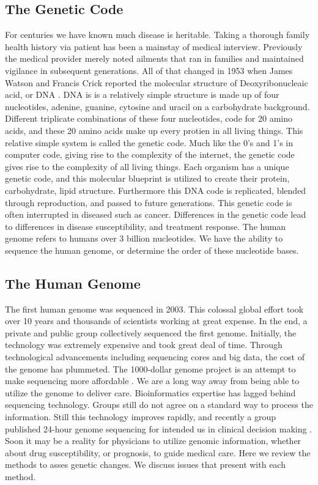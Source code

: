 \documentclass[sigconf]{acmart}
\begin{document}
\subsection{The Genetic Code}
For centuries we have known much disease is heritable. Taking a thorough family health history via patient has been a mainstay of medical interview.   Previously the medical provider merely noted ailments that ran in families and maintained vigilance in subsequent generations.  All of that changed in 1953 when James Watson and Francis Crick reported the molecular structure of Deoxyribonucleaic acid, or DNA \cite{watson1953molecular}.  DNA is is a relatively simple structure is made up of four nucleotides, adenine, guanine, cytosine and uracil on a carbohydrate background. Different triplicate combinations of these four nucleotides, code for 20 amino acids, and these 20 amino acids make up every protien in all living things.  This relative simple system is called the genetic code.  Much like the 0's and 1's in computer code, giving rise to the complexity of the internet, the genetic code gives rise to the complexity of all living things.  Each organism has a unique genetic code, and this molecular blueprint is utilized  to create their protein, carbohydrate, lipid structure.  Furthermore this DNA code is replicated, blended through reproduction, and passed to future generations.  This genetic code is often interrupted in diseased such as cancer.  Differences in the genetic code lead to differences in disease susceptibility, and treatment response.    The human genome refers to humans over 3 billion nucleotides.  We have the ability to sequence the human genome, or determine the order of these nucleotide bases. 

\subsection{The Human Genome}
    The first human genome was sequenced in 2003\cite{collins2003human}.  This colossal global
effort took over 10 years and thousands of scientists working at great
expense.  In the end, a private and public group collectively
sequenced the first genome.  Initially, the technology was extremely
expensive and took great deal of time.  Through technological
advancements including sequencing cores and big data, the cost of the
genome has plummeted.  The 1000-dollar genome project is an attempt to
make sequencing more affordable \cite{fox6}.  We are a long way away from
being able to utilize the genome to deliver care.  Bioinformatics
expertise has lagged behind sequencing technology.  Groups still do not agree on
a standard way to process the information.  Still this technology
improves rapidly, and recently a group published 24-hour genome
sequencing for intended us in clinical decision making \cite{saunders2012rapid}. Soon it may be
a reality for physicians to utilize genomic information, whether about
drug susceptibility, or prognosis, to guide medical care.  Here we review the methods to asses genetic changes.  We discuss issues that present with each method.  
\end{document}
